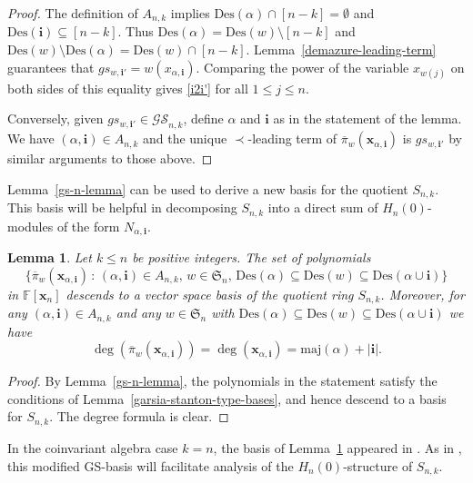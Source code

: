\documentclass[10pt]{amsart}
\newtheorem{lemma}[theorem]{Lemma}
\theoremstyle{definition}
\newcommand{\maj}{{\mathrm {maj}}}
\newcommand{\Des}{{\mathrm {Des}}}
\newcommand{\symm}{{\mathfrak{S}}}
\newcommand{\FF}{{\mathbb{F}}}
\newcommand{\GS}{{\mathcal{GS}}}
\newcommand{\xx}{{\mathbf {x}}}
\newcommand{\ii}{{\mathbf{i}}}
\newcommand{\pib}{\overline{\pi}}
\begin{document}
\begin{proof}
The definition of $A_{n,k}$ implies $\Des(\alpha)\cap[n-k]=\emptyset$ and $\Des(\ii)\subseteq[n-k]$.
Thus $\Des(\alpha)=\Des(w)\setminus[n-k]$ and $\Des(w)\setminus\Des(\alpha)=\Des(w)\cap[n-k]$.
Lemma~\ref{demazure-leading-term} guarantees that $gs_{w,\ii'} = w(x_{\alpha,\ii})$.   
Comparing the power of the variable $x_{w(j)}$ 
on both sides of this equality gives \eqref{i2i'} for all $1 \leq j \leq n$.

Conversely, given $gs_{w,\ii'} \in \GS_{n,k}$,
define $\alpha$ and $\ii$ as in the statement of the lemma.  We have $(\alpha,\ii) \in A_{n,k}$
and the unique $\prec$-leading term of $\pib_w(\xx_{\alpha,\ii})$ is $gs_{w,\ii'}$ by 
similar arguments to those above.
\end{proof}



Lemma~\ref{gs-n-lemma} can be used to derive a new basis for the quotient  $S_{n,k}$.
This basis will be helpful in decomposing $S_{n,k}$ into a direct sum of
$H_n(0)$-modules of the form $N_{\alpha,\ii}$.

\begin{lemma}
\label{new-basis-lemma}
Let $k \leq n$ be positive integers.  The set of polynomials
\begin{equation}
\label{new-basis}
\{ \pib_w(\xx_{\alpha,\ii}) \,:\, (\alpha,\ii) \in A_{n,k}, \, w \in \symm_n, \, \Des(\alpha) \subseteq \Des(w) 
\subseteq \Des(\alpha \cup \ii) \}
\end{equation}
in $\FF[\xx_n]$ descends to a vector space basis of the quotient ring $S_{n,k}$.  Moreover, 
for any $(\alpha, \ii) \in A_{n,k}$ and any $w \in \symm_n$
with $\Des(\alpha) \subseteq \Des(w) \subseteq \Des(\alpha \cup \ii)$ we have
\begin{equation}
\label{degree-formula}
\deg( \pib_w(\xx_{\alpha,\ii}) ) = \deg( \xx_{\alpha,\ii}) = \maj(\alpha) + |\ii|.
\end{equation}
\end{lemma} 

\begin{proof}
By Lemma~\ref{gs-n-lemma}, the polynomials in the statement satisfy the conditions
of Lemma~\ref{garsia-stanton-type-bases}, and hence descend to a basis for $S_{n,k}$.
The degree formula is clear.
\end{proof}


In the coinvariant algebra
case $k = n$, the basis of Lemma~\ref{new-basis-lemma} appeared in \cite{Huang}.
As in \cite{Huang}, this modified GS-basis will facilitate analysis 
of the $H_n(0)$-structure of $S_{n,k}$.
\end{document}
